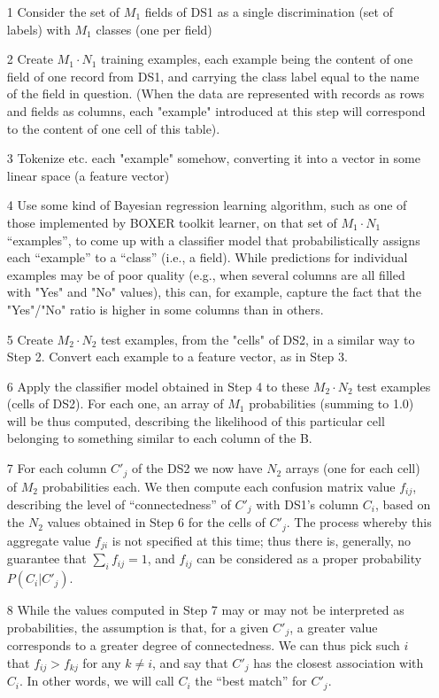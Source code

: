 \documentclass[12pt]{article}
\begin{document}
\begin{enumerate}
\item[1] Consider the set of $M_1$ fields of DS1 as a single
  discrimination (set of labels) with $M_1$ classes (one per field)

\item[2] Create $M_1 \cdot N_1$ training examples, each example being
  the content of one field of one record from DS1, and carrying the
  class label equal to the name of the field in question. (When the data are
  represented with records as rows and fields as columns, each
  "example" introduced at this step will correspond to the content of
  one cell of this table).

\item[3] Tokenize etc. each "example" somehow, converting it into a
  vector in some linear space (a feature vector)

\item[4] Use some kind of Bayesian regression learning algorithm, such
  as one of those implemented by BOXER toolkit learner, on that set of $M_1
  \cdot N_1$ ``examples'', to come up with a classifier model that
  probabilistically assigns each ``example'' to a ``class'' (i.e., a
  field).  While predictions for individual examples may be of poor
  quality (e.g., when several columns are all filled with "Yes" and
  "No" values), this can, for example, capture the fact that the
  "Yes"/"No" ratio is higher in some columns than in others.

\item[5] Create $M_2\cdot N_2$ test examples, from the "cells" of DS2, in a
similar way to Step 2. Convert each example to a feature vector, as in
Step 3.

\item[6] Apply the classifier model obtained in Step 4 to these $M_2
  \cdot N_2$ test examples (cells of DS2). For each one, an array of
  $M_1$ probabilities  (summing to 1.0) will be thus computed,
  describing the likelihood of this particular cell belonging to
  something similar to each column of the B.

\item[7] For each column $C'_j$ of the DS2 we now have $N_2$ arrays
  (one for each cell) of $M_2$ probabilities each. We then compute
  each confusion matrix value $f_{ij}$, describing the level of
  ``connectedness'' of $C'_j$ with DS1's column $C_i$, based on the
  $N_2$ values obtained in Step 6 for the cells of $C'_j$. The process
  whereby this aggregate value $f_{ji}$ is not specified at this time;
  thus there is, generally, no guarantee that $\sum_i {f_{ij}}=1$, and
  $f_{ij}$ can be considered as a proper probability
  $P(C_i|C'_j)$. 

\item[8] While the values computed in Step 7 may or may not be
  interpreted as probabilities, the assumption is that, for a given
  $C'_j$, a greater value corresponds to a greater degree of
  connectedness. We can thus pick such $i$ that $f_{ij} > f_{kj}$ for
  any $k\ne i$, and say that $C'_j$ has the closest association with
  $C_i$. In other words, we will call $C_i$ the ``best match'' for
  $C'_j$.

\end{enumerate}
\end{document}
